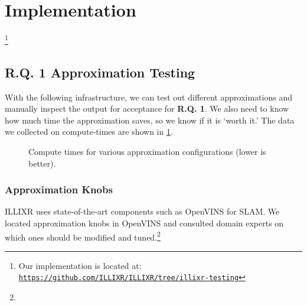 \newcommand{\ILLIXRlink}[1]{\href{https://github.com/ILLIXR/ILLIXR/tree/6c25003f79ecc35b4e002615b5a05d3077851d90}{\texttt{#1}}}

\section{Implementation}

\footnote{Our implementation is located at: \href{https://github.com/ILLIXR/ILLIXR/tree/illixr-testing}{\texttt{https://github.com/ILLIXR/ILLIXR/tree/illixr-testing}}}

\subsection{R.Q. 1 Approximation Testing}

With the following infrastructure, we can test out different approximations and manually inspect the output for acceptance for \textbf{R.Q. 1}.
We also need to know how much time the approximation saves, so we know if it is `worth it.'
The data we collected on compute-times are shown in \cref{compute-times}.

\begin{figure}
  \label{compute-times}
  \caption{Compute times for various approximation configurations (lower is better).}
\end{figure}

\subsubsection{Approximation Knobs}

ILLIXR uses state-of-the-art components such as OpenVINS \cite{Geneva2020ICRA} for SLAM.
We located approximation knobs in OpenVINS and consulted domain experts on which ones should be modified and tuned.\footnote{
}

